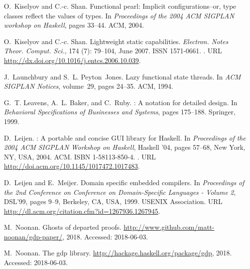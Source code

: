 \documentclass[format=sigplan, review=false, screen=true, 10pt]{acmart}
\begin{document}
\begin{thebibliography}{22}
O.~Kiselyov and C.-c. Shan.
\newblock Functional pearl: {I}mplicit configurations--or, type classes reflect
  the values of types.
\newblock In \emph{Proceedings of the 2004 ACM SIGPLAN workshop on Haskell},
  pages 33--44. ACM, 2004.

O.~Kiselyov and C.-c. Shan.
\newblock Lightweight static capabilities.
\newblock \emph{Electron. Notes Theor. Comput. Sci.}, 174
  (7): 79--104, June 2007.
\newblock ISSN 1571-0661.
\newblock {}.
\newblock URL \url{http://dx.doi.org/10.1016/j.entcs.2006.10.039}.

J.~Launchbury and S.~L. Peyton~Jones.
\newblock Lazy functional state threads.
\newblock In \emph{ACM SIGPLAN Notices}, volume~29, pages 24--35. ACM, 1994.

G.~T. Leavens, A.~L. Baker, and C.~Ruby.
: A notation for detailed design.
\newblock In \emph{Behavioral Specifications of Businesses and Systems}, pages
  175--188. Springer, 1999.

D.~Leijen.
: A portable and concise {GUI} library for {Haskell}.
\newblock In \emph{Proceedings of the 2004 ACM SIGPLAN Workshop on Haskell},
  Haskell \vspace{6in} '04, pages 57--68, New York, NY, USA, 2004. ACM.
\newblock ISBN 1-58113-850-4.
\newblock {}.
\newblock URL \url{http://doi.acm.org/10.1145/1017472.1017483}.

D.~Leijen and E.~Meijer.
\newblock Domain specific embedded compilers.
\newblock In \emph{Proceedings of the 2nd Conference on Conference on 
  Domain-Specific Languages - Volume 2}, DSL'99, pages 9--9, Berkeley, CA, USA,
  1999. USENIX Association.
\newblock URL \url{http://dl.acm.org/citation.cfm?id=1267936.1267945}.

M.~Noonan.
\newblock Ghosts of departed proofs.
\newblock \url{http://www.github.com/matt-noonan/gdp-paper/},
  2018{}.
\newblock Accessed: 2018-06-03.

M.~Noonan.
\newblock The {gdp} library.
\newblock \url{http://hackage.haskell.org/package/gdp}, 2018{}.
\newblock Accessed: 2018-06-03.


\end{thebibliography}
\end{document}
